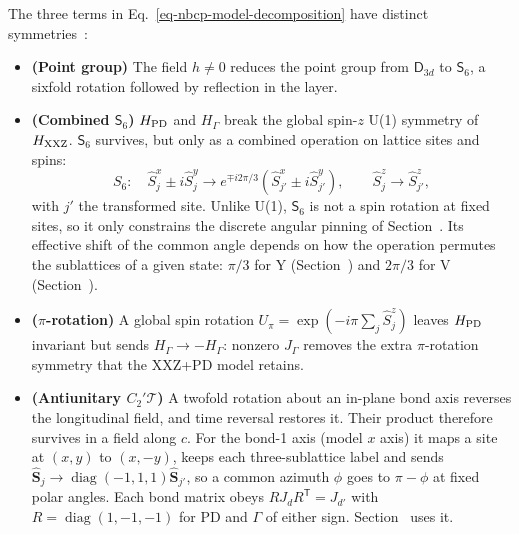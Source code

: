 The three terms in Eq.~\eqref{eq-nbcp-model-decomposition} have distinct
symmetries~\cite{park2026}:
\begin{itemize}
\item \textbf{(Point group)} The field $h\neq0$ reduces the point
group from $\mathsf D_{3d}$ to $\mathsf S_6$, a sixfold rotation
followed by reflection in the layer.
\item \textbf{(Combined $\mathsf S_6$)} $H_{\rm PD}$ and $H_\Gamma$
break the global spin-$z$ U(1) symmetry of $H_{\rm XXZ}$.
$\mathsf S_6$ survives, but only as a combined operation on lattice
sites and spins:
\begin{equation}\label{eq-nbcp-s6-transform}
S_6:\quad
\hat S_j^x\pm i\hat S_j^y\longrightarrow
 e^{\mp i2\pi/3}(\hat S_{j'}^x\pm i\hat S_{j'}^y),
\qquad \hat S_j^z\longrightarrow\hat S_{j'}^z,
\end{equation}
with $j'$ the transformed site. Unlike U(1), $\mathsf S_6$ is not a
spin rotation at fixed sites, so it only constrains the discrete angular
pinning of Section~.
Its effective shift of the common angle depends on how the operation
permutes the sublattices of a given state: \(\pi/3\) for Y
(Section~) and \(2\pi/3\) for V
(Section~).
\item \textbf{($\pi$-rotation)} A global spin rotation
$U_\pi=\exp(-i\pi\sum_j\hat S_j^z)$ leaves $H_{\rm PD}$ invariant but
sends $H_\Gamma\to-H_\Gamma$: nonzero $J_\Gamma$ removes the extra
$\pi$-rotation symmetry that the XXZ+PD model retains.
\item \textbf{(Antiunitary $C_2'\mathcal T$)} A twofold rotation about
an in-plane bond axis reverses the longitudinal field, and time reversal
restores it. Their product therefore survives in a field along $c$. For
the bond-1 axis (model $x$ axis) it maps a site at $(x,y)$ to $(x,-y)$,
keeps each three-sublattice label and sends
$\hat{\mathbf S}_j\to\operatorname{diag}(-1,1,1)\hat{\mathbf S}_{j'}$, so a
common azimuth $\phi$ goes to $\pi-\phi$ at fixed polar angles. Each
bond matrix obeys $RJ_dR^{\mathsf T}=J_{d'}$ with
$R=\operatorname{diag}(1,-1,-1)$ for PD and $\Gamma$ of either sign.
Section~ uses it.
\end{itemize}

